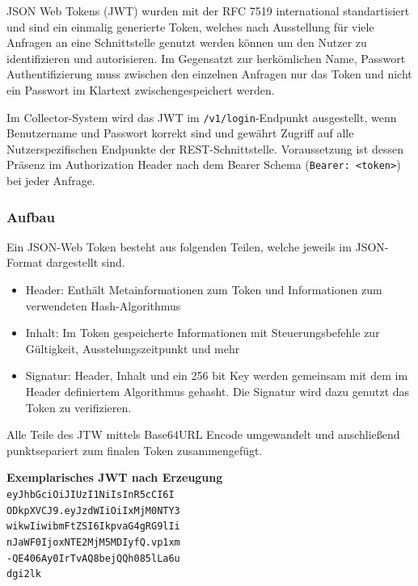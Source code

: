         JSON Web Tokens (JWT) wurden mit der RFC 7519 international standartisiert und sind ein einmalig generierte Token, welches nach Ausstellung für viele Anfragen an eine Schnittstelle genutzt werden können um den Nutzer zu identifizieren und autorisieren. Im Gegensatzt zur herkömlichen Name, Passwort Authentifizierung muss zwischen den einzelnen Anfragen nur das Token und nicht ein Passwort im Klartext zwischengespeichert werden.

        Im Collector-System wird das JWT im \texttt{/v1/login}-Endpunkt ausgestellt, wenn Benutzername und Passwort korrekt sind und gewährt Zugriff auf alle Nutzerspezifischen Endpunkte der REST-Schnittstelle. Voraussetzung ist dessen Präsenz im Authorization Header nach dem Bearer Schema (\texttt{Bearer: <token>}) bei jeder Anfrage.
        
        \subsubsection{Aufbau}
        Ein JSON-Web Token besteht aus folgenden Teilen, welche jeweils im JSON-Format dargestellt sind.
        \begin{itemize}
            \item Header: Enthält Metainformationen zum Token und Informationen zum verwendeten Hash-Algorithmus
            \item Inhalt: Im Token gespeicherte Informationen mit Steuerungsbefehle zur Gültigkeit, Ausstelungszeitpunkt und mehr
            \item Signatur: Header, Inhalt und ein 256 bit Key werden gemeinsam mit dem im Header definiertem Algorithmus gehasht. Die Signatur wird dazu genutzt das Token zu verifizieren.
        \end{itemize}
        
        Alle Teile des JTW mittels Base64URL Encode umgewandelt und anschließend punktsepariert zum finalen Token zusammengefügt.
        
        \begin{center}
            \textbf{Exemplarisches JWT nach Erzeugung} \\
            \texttt{eyJhbGciOiJIUzI1NiIsInR5cCI6I \\
            ODkpXVCJ9.eyJzdWIiOiIxMjM0NTY3 \\
            wikwIiwibmFtZSI6IkpvaG4gRG9lIi \\
            nJaWF0IjoxNTE2MjM5MDIyfQ.vp1xm \\
            -QE406Ay0IrTvAQ8bejQQh085lLa6u \\
            dgi2lk}
        \end{center}
        
